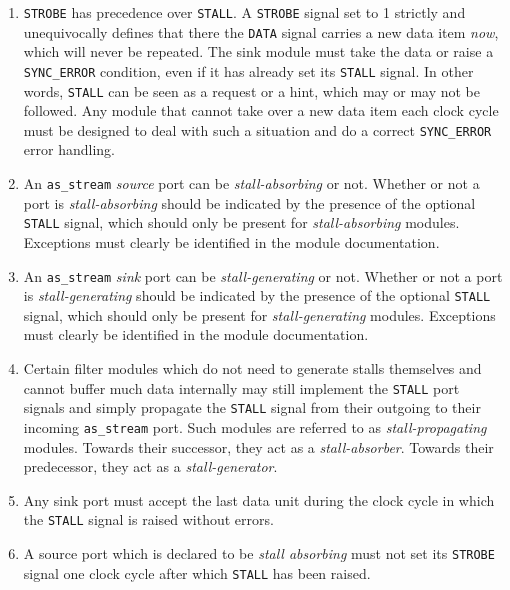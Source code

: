 \begin{enumerate}

\item \texttt{STROBE} has precedence over \texttt{STALL}. A \texttt{STROBE} signal set to 1 strictly and unequivocally defines that there the \texttt{DATA} signal carries a new data item \textit{now}, which will never be repeated. The sink module must take the data or raise a \texttt{SYNC\_ERROR} condition, even if it has already set its \texttt{STALL} signal. In other words, \texttt{STALL} can be seen as a request or a hint, which may or may not be followed. Any module that cannot take over a new data item each clock cycle must be designed to deal with such a situation and do a correct \texttt{SYNC\_ERROR} error handling.

\item An \texttt{as\_stream} \textit{source} port can be \textit{stall-absorbing} or not. Whether or not a port is \textit{stall-absorbing} should be indicated by the presence of the optional \texttt{STALL} signal, which should only be present for \textit{stall-absorbing} modules. Exceptions must clearly be identified in the module documentation.

\item An \texttt{as\_stream} \textit{sink} port can be \textit{stall-generating} or not. Whether or not a port is \textit{stall-generating} should be indicated by the presence of the optional \texttt{STALL} signal, which should only be present for \textit{stall-generating} modules. Exceptions must clearly be identified in the module documentation.

\item Certain filter modules which do not need to generate stalls themselves and cannot buffer much data internally may still implement the \texttt{STALL} port signals and simply propagate the \texttt{STALL} signal from their outgoing to their incoming \texttt{as\_stream} port. Such modules are referred to as \textit{stall-propagating} modules. Towards their successor, they act as a \textit{stall-absorber}. Towards their predecessor, they act as a \textit{stall-generator}.

\item Any sink port must accept the last data unit during the clock cycle in which the \texttt{STALL} signal is raised without errors. \label{05-03-cond_stall_sink}

\item A source port which is declared to be \textit{stall absorbing} must not set its \texttt{STROBE} signal one clock cycle after which \texttt{STALL} has been raised.

\end{enumerate}

